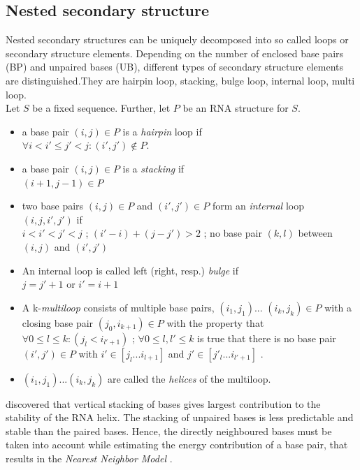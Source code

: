 \documentclass[twoside,a4paper]{report}
\begin{document}
	\subsection{Nested secondary structure}
	Nested secondary structures can be uniquely decomposed into so called loops or secondary structure elements. Depending on the number of enclosed base pairs (BP) and unpaired bases (UB), different types of secondary structure elements are distinguished.They are hairpin loop, stacking, bulge loop, internal loop, multi loop. \\
	Let $S$ be a fixed sequence. Further, let $P$ be an RNA structure for $S$.
	\begin{itemize}
		\item a base pair $( i, j ) \in P$ is a \textit{hairpin} loop if\\
			$	\forall i < i' \leq j' < j : (i', j') \notin P. $

		\item a base pair $( i, j ) \in P$ is a \textit{stacking} if\\
		$(i + 1 , j - 1 ) \in P $
		\item two base pairs $ (i, j) \in P$ and $(i' ,j' ) \in P$ form  an \textit{internal} loop $(i,j,i',j')$ if \\
		$i < i' < j' < j $ ; $ (i' - i)+( j - j') > 2$ ; no base pair $(k,l)$ between $(i, j)$ and $(i',j')$
		\item An internal loop is called left (right, resp.) \textit{bulge} if\\
		$ j = j' +1 $ or $ i' = i+1$
		\item A k-\textit{multiloop} consists of multiple base pairs, $(i_1,j_1)$... $(i_k,j_k) \in P$ with a closing base pair $(j_0, i_{k+1}) \in P$ with the property that \\
		$\forall 0 \leq l \leq k : ( j_l < i_{l'+1})$ ; $\forall 0 \leq l , l' \leq k$ is true that there is no base pair $(i' ,j') \in P$ with $i' \in [j_l...i_{l+1}]$ and $j' \in [j'_l...i_{l'+1}]$ .
		\item $(i_1,j_1)...(i_k, j_k)$ are called the \textit{helices} of the multiloop.\\
 	\end{itemize}
 
 
 	 \citeauthor{DeVoe1962TheSO} discovered that vertical stacking of bases gives largest contribution to the stability of the RNA helix. The stacking of unpaired bases is less predictable and stable than the paired bases. Hence, the directly neighboured bases must be taken into account while estimating the energy contribution of a  base pair, that results in the \textit{Nearest Neighbor Model} \citep{borer1974stability}.\\
 	 
\end{document}
